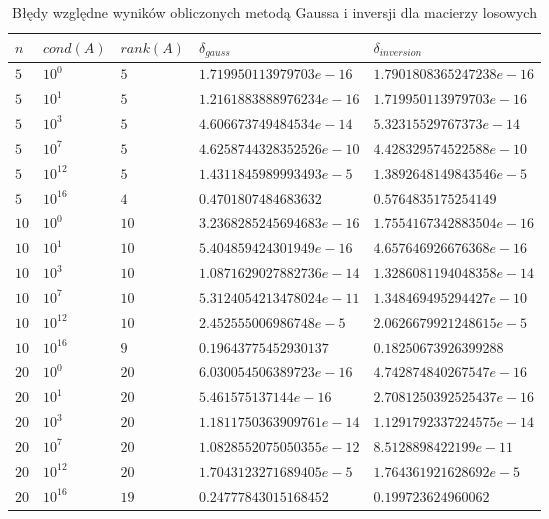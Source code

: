 \documentclass[12pt]{article}
\begin{document}
        \begin{table}
            \begin{tabularx}{\textwidth}{l l l l l }
                \hline
                $n$ & $cond(A)$ & $rank(A)$ & $\delta_{gauss}$ & $\delta_{inversion}$ \\
                \hline
                $5$ & $10^{0}$ & $5$ & $1.719950113979703e-16$ & $1.7901808365247238e-16$ \\
                $5$ & $10^{1}$ & $5$ & $1.2161883888976234e-16$ & $1.719950113979703e-16$ \\
                $5$ & $10^{3}$ & $5$ & $4.606673749484534e-14$ & $5.32315529767373e-14$ \\
                $5$ & $10^{7}$ & $5$ & $4.6258744328352526e-10$ & $4.428329574522588e-10$ \\
                $5$ & $10^{12}$ & $5$ & $1.4311845989993493e-5$ & $1.3892648149843546e-5$ \\
                $5$ & $10^{16}$ & $4$ & $0.4701807484683632$ & $0.5764835175254149$ \\
                $10$ & $10^{0}$ & $10$ & $3.2368285245694683e-16$ & $1.7554167342883504e-16$ \\
                $10$ & $10^{1}$ & $10$ & $5.404859424301949e-16$ & $4.657646926676368e-16$ \\
                $10$ & $10^{3}$ & $10$ & $1.0871629027882736e-14$ & $1.3286081194048358e-14$ \\
                $10$ & $10^{7}$ & $10$ & $5.3124054213478024e-11$ & $1.348469495294427e-10$ \\
                $10$ & $10^{12}$ & $10$ & $2.452555006986748e-5$ & $2.0626679921248615e-5$ \\
                $10$ & $10^{16}$ & $9$ & $0.19643775452930137$ & $0.18250673926399288$ \\
                $20$ & $10^{0}$ & $20$ & $6.030054506389723e-16$ & $4.742874840267547e-16$ \\
                $20$ & $10^{1}$ & $20$ & $5.461575137144e-16$ & $2.7081250392525437e-16$ \\
                $20$ & $10^{3}$ & $20$ & $1.1811750363909761e-14$ & $1.1291792337224575e-14$ \\
                $20$ & $10^{7}$ & $20$ & $1.0828552075050355e-12$ & $8.5128898422199e-11$ \\
                $20$ & $10^{12}$ & $20$ & $1.7043123271689405e-5$ & $1.764361921628692e-5$ \\
                $20$ & $10^{16}$ & $19$ & $0.24777843015168452$ & $0.199723624960062$ \\
                \hline
            \end{tabularx}
            \label{table:random_matrix_error}
            \caption{Błędy względne wyników obliczonych metodą Gaussa i inversji dla macierzy losowych}
        \end{table}
        \noindent\newline
\end{document}
